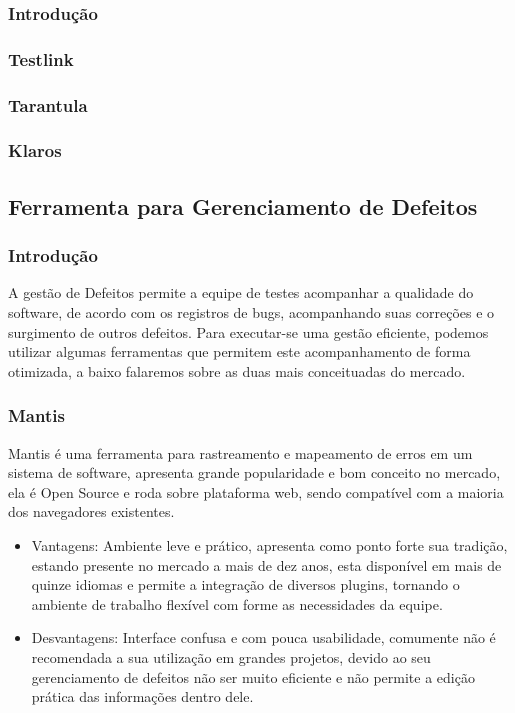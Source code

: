 \documentclass[12pt,a4paper]{article}
\begin{document}
		\subsubsection{Introdução}
		\subsubsection{Testlink}
		\subsubsection{Tarantula}
		\subsubsection{Klaros}
		
	\subsection{Ferramenta para Gerenciamento de Defeitos}
		\subsubsection{Introdução}
		
			A gestão de Defeitos permite a equipe de testes acompanhar a qualidade do software, 
			de acordo com os registros de bugs, acompanhando suas correções e o surgimento de outros defeitos. 
			Para executar-se uma gestão eficiente, podemos utilizar algumas ferramentas que permitem este acompanhamento de forma otimizada, 
			a baixo falaremos sobre as duas mais conceituadas do mercado.
			
		\subsubsection{Mantis}
		
			Mantis é uma ferramenta para rastreamento e mapeamento de erros em um sistema de software, 
			apresenta grande popularidade e bom conceito no mercado, ela é Open Source e roda sobre plataforma web, 
			sendo compatível com a maioria dos navegadores existentes. 	

				\begin{itemize}
					\item Vantagens: 
						Ambiente leve e prático, apresenta como ponto forte sua tradição, estando presente no mercado a mais de dez anos, 
					  esta disponível em mais de quinze idiomas e permite a integração de diversos plugins, tornando o ambiente de trabalho flexível
					  com forme as necessidades da equipe. 					
					
					\item Desvantagens:
						Interface confusa e com pouca usabilidade, comumente não é recomendada a sua utilização em grandes projetos, 
						devido ao seu gerenciamento de defeitos não ser muito eficiente e não permite a edição prática das informações dentro dele. 
						
				\end{itemize}
						
\end{document}
